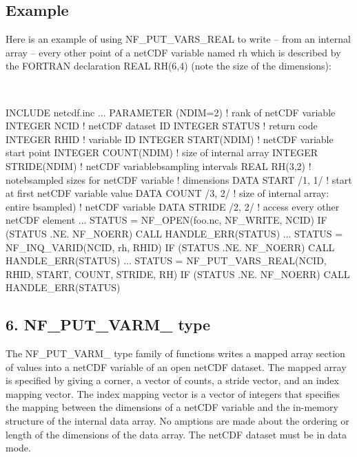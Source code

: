 \subsection*{Example }

Here is an example of using N\+F\+\_\+\+P\+U\+T\+\_\+\+V\+A\+R\+S\+\_\+\+R\+E\+AL to write – from an internal array – every other point of a net\+C\+DF variable named rh which is described by the F\+O\+R\+T\+R\+AN declaration R\+E\+AL R\+H(6,4) (note the size of the dimensions)\+:

 

I\+N\+C\+L\+U\+DE \textquotesingle{}netcdf.\+inc\textquotesingle{} ... P\+A\+R\+A\+M\+E\+T\+ER (N\+D\+IM=2) ! rank of net\+C\+DF variable I\+N\+T\+E\+G\+ER N\+C\+ID ! net\+C\+DF dataset ID I\+N\+T\+E\+G\+ER S\+T\+A\+T\+US ! return code I\+N\+T\+E\+G\+ER R\+H\+ID ! variable ID I\+N\+T\+E\+G\+ER S\+T\+A\+R\+T(\+N\+D\+I\+M) ! net\+C\+DF variable start point I\+N\+T\+E\+G\+ER C\+O\+U\+N\+T(\+N\+D\+I\+M) ! size of internal array I\+N\+T\+E\+G\+ER S\+T\+R\+I\+D\+E(\+N\+D\+I\+M) ! net\+C\+DF variablebsampling intervals R\+E\+AL R\+H(3,2) ! notebsampled sizes for net\+C\+DF variable ! dimensions D\+A\+TA S\+T\+A\+RT /1, 1/ ! start at first net\+C\+DF variable value D\+A\+TA C\+O\+U\+NT /3, 2/ ! size of internal array\+: entire bsampled) ! net\+C\+DF variable D\+A\+TA S\+T\+R\+I\+DE /2, 2/ ! access every other net\+C\+DF element ... S\+T\+A\+T\+US = N\+F\+\_\+\+O\+P\+EN(\textquotesingle{}foo.\+nc\textquotesingle{}, N\+F\+\_\+\+W\+R\+I\+TE, N\+C\+ID) IF (S\+T\+A\+T\+US .NE. N\+F\+\_\+\+N\+O\+E\+RR) C\+A\+LL H\+A\+N\+D\+L\+E\+\_\+\+E\+R\+R(\+S\+T\+A\+T\+U\+S) ... S\+T\+A\+T\+US = N\+F\+\_\+\+I\+N\+Q\+\_\+\+V\+A\+R\+ID(N\+C\+ID, \textquotesingle{}rh\textquotesingle{}, R\+H\+ID) IF (S\+T\+A\+T\+US .NE. N\+F\+\_\+\+N\+O\+E\+RR) C\+A\+LL H\+A\+N\+D\+L\+E\+\_\+\+E\+R\+R(\+S\+T\+A\+T\+U\+S) ... S\+T\+A\+T\+US = N\+F\+\_\+\+P\+U\+T\+\_\+\+V\+A\+R\+S\+\_\+\+R\+E\+A\+L(\+N\+C\+I\+D, R\+H\+I\+D, S\+T\+A\+R\+T, C\+O\+U\+N\+T, S\+T\+R\+I\+D\+E, R\+H) IF (S\+T\+A\+T\+US .NE. N\+F\+\_\+\+N\+O\+E\+RR) C\+A\+LL H\+A\+N\+D\+L\+E\+\_\+\+E\+R\+R(\+S\+T\+A\+T\+U\+S)

\subsection*{6. N\+F\+\_\+\+P\+U\+T\+\_\+\+V\+A\+R\+M\+\_\+ type }

The N\+F\+\_\+\+P\+U\+T\+\_\+\+V\+A\+R\+M\+\_\+ type family of functions writes a mapped array section of values into a net\+C\+DF variable of an open net\+C\+DF dataset. The mapped array is specified by giving a corner, a vector of counts, a stride vector, and an index mapping vector. The index mapping vector is a vector of integers that specifies the mapping between the dimensions of a net\+C\+DF variable and the in-\/memory structure of the internal data array. No amptions are made about the ordering or length of the dimensions of the data array. The net\+C\+DF dataset must be in data mode.

